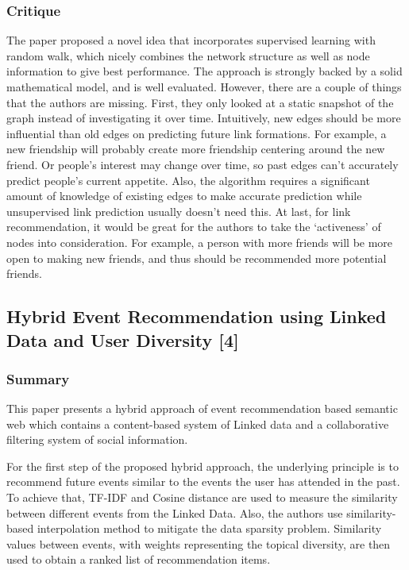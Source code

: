 \documentclass{article}
\begin{document}
\subsubsection{Critique}
The paper proposed a novel idea that incorporates supervised learning with random walk, which nicely combines the network structure as well as node information to give best performance. The approach is strongly backed by a solid mathematical model, and is well evaluated. However, there are a couple of things that the authors are missing. First, they only looked at a static snapshot of the graph instead of investigating it over time. Intuitively, new edges should be more influential than old edges on predicting future link formations. For example, a new friendship will probably create more friendship centering around the new friend. Or people’s interest may change over time, so past edges can’t accurately predict people’s current appetite. Also, the algorithm requires a significant amount of knowledge of existing edges to make accurate prediction while unsupervised link prediction usually doesn’t need this. At last, for link recommendation, it would be great for the authors to take the ‘activeness’ of nodes into consideration. For example, a person with more friends will be more open to making new friends, and thus should be recommended more potential friends.

\subsection{Hybrid Event Recommendation using Linked Data and User Diversity [4]}
\subsubsection{Summary}
This paper presents a hybrid approach of event recommendation based semantic web which contains a content-based system of Linked data and a collaborative filtering system of social information.

For the first step of the proposed hybrid approach, the underlying principle is to recommend future events similar to the events the user has attended in the past. To achieve that, TF-IDF and Cosine distance are used to measure the similarity between different events from the Linked Data. Also, the authors use similarity-based interpolation method to mitigate the data sparsity problem. Similarity values between events, with weights representing the topical diversity, are then used to obtain a ranked list of recommendation items.
\end{document}
